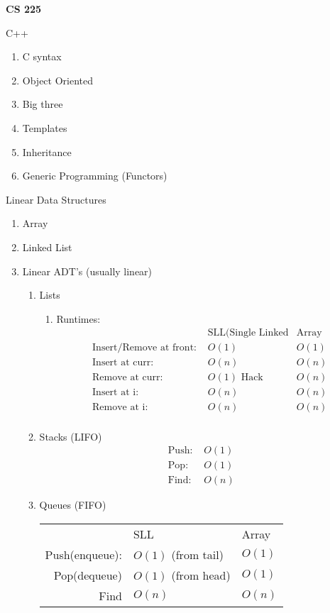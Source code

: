 \documentclass[12pt]{article}
\renewcommand{\=}[1]{\stackrel{#1}{=}} %
\theoremstyle{definition}
\theoremstyle{remark}
\begin{document}
\begin{center}
  {\LARGE
    \textbf{CS 225}\\
  }
  
\end{center}
C++
\begin{enumerate}
\item C syntax
\item Object Oriented
\item Big three
\item Templates
\item Inheritance
\item Generic Programming (Functors)
\end{enumerate}
Linear Data Structures
\begin{enumerate}
\item Array
\item Linked List
\item Linear ADT's (usually linear)
  \begin{enumerate}
  \item Lists
    \begin{enumerate}
    \item Runtimes:
      \begin{align*}
        &\textrm{SLL(Single Linked} & \textrm{Array}\\
        \textrm{Insert/Remove at front:   } & O(1) & O(1)\\
        \textrm{Insert at curr:   } & O(n) & O(n)\\
        \textrm{Remove at curr:   } & O(1)\textrm{ Hack} & O(n)\\
        \textrm{Insert at i:   } & O(n) & O(n) \\
        \textrm{Remove at i:   } & O(n) & O(n) \\
      \end{align*}
    \end{enumerate}
    \item Stacks (LIFO)
      \begin{align*}
        \textrm{Push: } & O(1) \\
        \textrm{Pop: } & O(1) \\
        \textrm{Find: } & O(n)
      \end{align*}
    \item Queues (FIFO)
      \begin{tabular}{r  l  l }
        & SLL & Array\\
        Push(enqueue): & $O(1)$ (from tail)& $O(1)$ \\
        Pop(dequeue) & $O(1)$ (from head)  & $O(1)$\\
        Find & $O(n)$ & $O(n)$
      \end{tabular}
        


\end{enumerate}
\end{enumerate}
\end{document}
